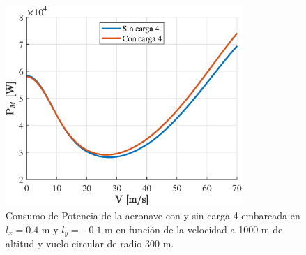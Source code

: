 \begin{figure}
	\centering
	\includegraphics[width=90mm]{graficos/PMVCSP}
	\caption{Consumo de Potencia de la aeronave con y sin carga 4 embarcada en $l_x=0.4$ m y $l_y=-0.1$ m en función de la velocidad a 1000 m de altitud y vuelo circular de radio 300 m.}
	\label{PMVCSP}
\end{figure}

